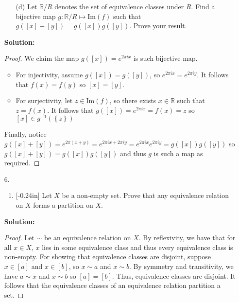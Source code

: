 \documentclass[letterpaper,12pt]{article}
\newcommand{\set}[1]{\left\{ #1 \right\}}
\theoremstyle{definition}
\begin{document}
\begin{enumerate}
    \item[] \begin{enumerate}
        \item[(d)] Let $\mathbb{R}/R$ denotes the set of equivalence classes under $R$. Find a bijective map $g : \mathbb{R}/R \mapsto \mathrm{Im}(f)$ such that $g([x] + [y]) = g([x])g([y])$. Prove your result.
    \end{enumerate}
     \begin{mdframed}
            \textbf{Solution:}
            \begin{proof}
                We claim the map $g([x]) = e^{2\pi i x}$ is such bijective map. \begin{itemize}
                    \item For injectivity, assume $g([x]) = g([y])$, so $ e^{2\pi i x} =  e^{2\pi i y}$. It follows that $f(x) = f(y)$ so $[x] = [y]$.
                    \item For surjectivity, let $z \in \mathrm{Im}(f)$, so there exists $x \in \mathbb{R}$ such that $z = f(x)$. It follows that $g([x]) = e^{2\pi i x} = f(x) = z$ so $[x] \in g^{-1}(\set{z})$
                \end{itemize}
                Finally, notice $g([x] + [y]) = e^{2\pi (x + y)} = e^{2\pi i x + 2\pi i y} = e^{2\pi i x} e^{2\pi i y} = g([x])g([y])$ so $g([x] + [y]) = g([x])g([y])$ and thus $g$ is such a map as required.
            \end{proof}
        \end{mdframed}
\end{enumerate}
\pagebreak
\begin{enumerate}
    \item[6.]  \begin{enumerate}
    \item \reversemarginpar{}[-0.24in] 
Let $X$ be a non-empty set. Prove that any equivalence relation on $X$ forms a partition on $X$.
\end{enumerate}
 \begin{mdframed}
            \textbf{Solution:}
            \begin{proof}
               Let $\sim$ be an equivalence relation on $X$. By reflexivity, we have that for all $x \in X$, $x$ lies in some equivalence class and thus every equivalence class is non-empty. For showing that equivalence classes are disjoint, suppose $x \in [a]$ and $x \in [b]$, so $x \sim a$ and $x \sim b$. By symmetry and transitivity, we have $a \sim x$ and $x \sim b$ so $[a] = [b]$. Thus, equivalence classes are disjoint. It follows that the equivalence classes of an equivalence relation partition a set.
            \end{proof}
        \end{mdframed}
\end{enumerate}
\end{document}
